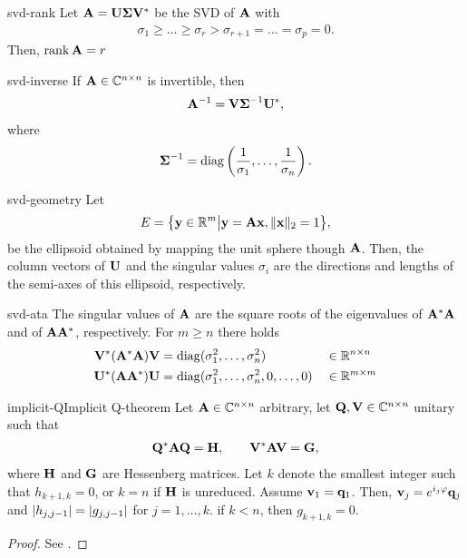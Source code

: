 \begin{Corollary}{svd-rank}
  Let $\mathbf A = \mathbf U\boldsymbol\Sigma\mathbf V^*$ be the SVD of $\mathbf A$ with
  \begin{gather}
    \sigma_1 \ge \dots \ge \sigma_r > \sigma_{r+1} = \dots = \sigma_p = 0.
  \end{gather}
  Then, $\operatorname{rank} \mathbf A = r$
\end{Corollary}

\begin{Corollary}{svd-inverse}
  If $\mathbf A\in\mathbb C^{n\times n}$ is invertible, then
  \begin{gather}
    \mathbf A^{-1} = \mathbf V\boldsymbol\Sigma^{-1}\mathbf U^*,
  \end{gather}
  where
  \begin{gather}
    \boldsymbol\Sigma^{-1} = \operatorname{diag}\left(\frac1{\sigma_1},\dots,\frac1{\sigma_n}\right).
  \end{gather}
\end{Corollary}

\begin{Remark}{svd-geometry}
  Let
  \begin{gather}
    E = \bigl\{ \mathbf y\in \mathbb R^m \big| \mathbf y=\mathbf A\mathbf x, \lVert\mathbf x\rVert_2 = 1 \bigr\},
  \end{gather}
  be the ellipsoid obtained by mapping the unit sphere though
  $\mathbf A$. Then, the column vectors of $\mathbf U$ and the singular values
  $\sigma_i$ are the directions and lengths of the semi-axes of this
  ellipsoid, respectively.
\end{Remark}

\begin{Lemma}{svd-ata}
  The singular values of $\mathbf A$ are the square roots of the
  eigenvalues of $\mathbf A^*\mathbf A$ and of $\mathbf A\mathbf A^*$, respectively. For $m\ge n$ there holds
  \begin{align}
    \mathbf V^*(\mathbf A^*\mathbf A)\mathbf V &= \operatorname{diag}(\sigma_1^2,\dots,\sigma_n^2)
    &&\in \mathbb R^{n\times n}\\
    \mathbf U^*(\mathbf A\mathbf A^*)\mathbf U &= \operatorname{diag}(\sigma_1^2,\dots,\sigma_n^2, 0,\dots,0)
    &&\in \mathbb R^{m\times m}
  \end{align}
\end{Lemma}

\begin{Theorem*}{implicit-Q}{Implicit Q-theorem}
  Let $\mathbf A\in\mathbb C^{n\times n}$ arbitrary, let $\mathbf Q,\mathbf V\in\mathbb C^{n\times n}$ unitary such that
  \begin{gather}
    \mathbf Q^*\mathbf A\mathbf Q = \mathbf H,\qquad \mathbf V^*\mathbf A\mathbf V = \mathbf G,
  \end{gather}
  where $\mathbf H$ and $\mathbf G$ are Hessenberg matrices. Let $k$ denote
  the smallest integer such that $h_{k+1,k} = 0$, or $k=n$ if $\mathbf H$
  is unreduced. Assume $\mathbf v_1 = \mathbf q_1$. Then,
  $\mathbf v_j = e^{i_j\varphi}\mathbf q_j$ and $\lvert h_{j,j-1}\rvert = \lvert g_{j,j-1}\rvert$
  for $j=1,\dots,k$. if $k<n$, then $g_{k+1,k} = 0$.
\end{Theorem*}

\begin{proof}
  See \cite[Theorem 7.4-2]{GolubVanLoan83}.
\end{proof}

